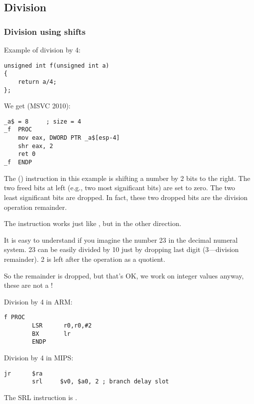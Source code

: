 \subsection{Division}

\subsubsection{Division using shifts}
\label{division_by_shifting}

Example of division by 4:

\begin{lstlisting}[style=customc]
unsigned int f(unsigned int a)
{
	return a/4;
};
\end{lstlisting}

We get (MSVC 2010):

\begin{lstlisting}[caption=MSVC 2010,style=customasmx86]
_a$ = 8		; size = 4
_f	PROC
	mov	eax, DWORD PTR _a$[esp-4]
	shr	eax, 2
	ret	0
_f	ENDP
\end{lstlisting}

\label{SHR}

The \SHR () instruction in this example is shifting a number by 2 bits to the right.
The two freed bits at left (e.g., two most significant bits) are set to zero.
The two least significant bits are dropped.
In fact, these two dropped bits are the division operation remainder.


The \SHR instruction works just like \SHL, but in the other direction.



It is easy to understand if you imagine the number 23 in the decimal numeral system.
23 can be easily divided by 10 just by dropping last digit (3---division remainder). 
2 is left after the operation as a \gls{quotient}.

So the remainder is dropped, but that's OK, we work on integer values anyway, 
these are not a !

Division by 4 in ARM:

\begin{lstlisting}[caption=\NonOptimizingKeilVI (\ARMMode),style=customasmARM]
f PROC
        LSR      r0,r0,#2
        BX       lr
        ENDP
\end{lstlisting}

Division by 4 in MIPS:

\begin{lstlisting}[caption=\Optimizing GCC 4.4.5 (IDA),style=customasmMIPS]
        jr      $ra
        srl     $v0, $a0, 2 ; branch delay slot
\end{lstlisting}

The SRL instruction is .
